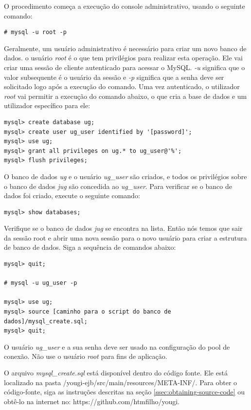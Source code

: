 \documentclass[envcountsame,envcountchap]{svmono}
\begin{document}
O procedimento começa a execução do console administrativo, usando o seguinte comando:

\begin{verbatim}
# mysql -u root -p
\end{verbatim}

Geralmente, um usuário administrativo é necessário para criar um novo banco de dados. o usuário \textit{root} é o que tem privilégios para realizar esta operação. Ele vai criar uma sessão de cliente autenticado para acessar o MySQL. \textit{-u} significa que o valor subsequente é o usuário da sessão e \textit{-p} significa que a senha deve ser solicitado logo após a execução do comando. Uma vez autenticado, o utilizador \textit{root} vai permitir a execução do comando abaixo, o que cria a base de dados e um utilizador específico para ele:

\begin{verbatim}
mysql> create database ug;
mysql> create user ug_user identified by '[password]';
mysql> use ug;
mysql> grant all privileges on ug.* to ug_user@'%';
mysql> flush privileges;
\end{verbatim}

O banco de dados \textit{ug} e o usuário \textit{ug\_user} são criados, e todos os privilégios sobre o banco de dados \textit{jug} são concedida ao \textit{ug\_user}. Para verificar se o banco de dados foi criado, execute o seguinte comando:

\begin{verbatim}
mysql> show databases;
\end{verbatim}

Verifique se o banco de dados \textit{jug} se encontra na lista. Então nós temos que sair da sessão root e abrir uma nova sessão para o novo usuário para criar a estrutura de banco de dados. Siga a sequência de comandos abaixo:

\begin{verbatim}
mysql> quit;

# mysql -u ug_user -p

mysql> use ug;
mysql> source [caminho para o script do banco de dados]/mysql_create.sql;
mysql> quit;
\end{verbatim}

O usuário \textit{ug\_user} e a sua senha deve ser usado na configuração do pool de conexão. Não use o usuário \textit{root} para fins de aplicação.

O arquivo \textit{mysql\_create.sql} está disponível dentro do código fonte. Ele está localizado na pasta /yougi-ejb/src/main/resources/META-INF/. Para obter o código-fonte, siga as instruções descritas na seção \ref{ssec:obtaining-source-code} ou obtê-lo na internet no: https://github.com/htmfilho/yougi.
\end{document}
